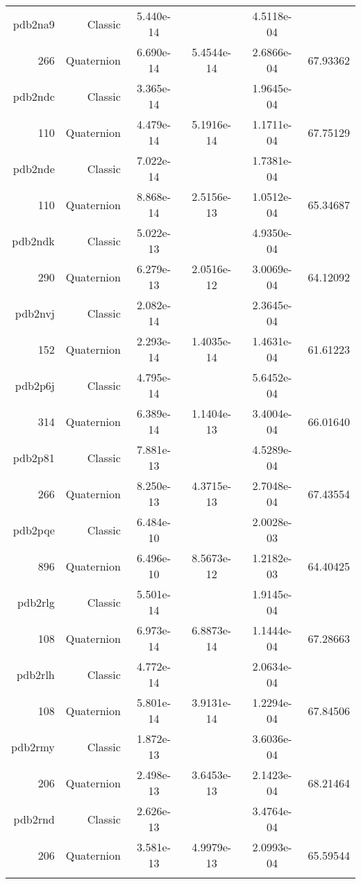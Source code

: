 \begin{xltabular}{\textwidth}{r|rS[table-format=1.3e+2]S[table-format=1.4e+2]S[table-format=1.4e+2]S[table-format=-1.5]}
pdb2na9 & Classic & 5.440e-14 &  & 4.5118e-04 & \\
266 & Quaternion & 6.690e-14 & 5.4544e-14 & 2.6866e-04 & 67.93362\\  \addlinespace
pdb2ndc & Classic & 3.365e-14 &  & 1.9645e-04 & \\
110 & Quaternion & 4.479e-14 & 5.1916e-14 & 1.1711e-04 & 67.75129\\  \addlinespace
pdb2nde & Classic & 7.022e-14 &  & 1.7381e-04 & \\
110 & Quaternion & 8.868e-14 & 2.5156e-13 & 1.0512e-04 & 65.34687\\  \addlinespace
pdb2ndk & Classic & 5.022e-13 &  & 4.9350e-04 & \\
290 & Quaternion & 6.279e-13 & 2.0516e-12 & 3.0069e-04 & 64.12092\\  \addlinespace
pdb2nvj & Classic & 2.082e-14 &  & 2.3645e-04 & \\
152 & Quaternion & 2.293e-14 & 1.4035e-14 & 1.4631e-04 & 61.61223\\  \addlinespace
pdb2p6j & Classic & 4.795e-14 &  & 5.6452e-04 & \\
314 & Quaternion & 6.389e-14 & 1.1404e-13 & 3.4004e-04 & 66.01640\\  \addlinespace
pdb2p81 & Classic & 7.881e-13 &  & 4.5289e-04 & \\
266 & Quaternion & 8.250e-13 & 4.3715e-13 & 2.7048e-04 & 67.43554\\  \addlinespace
pdb2pqe & Classic & 6.484e-10 &  & 2.0028e-03 & \\
896 & Quaternion & 6.496e-10 & 8.5673e-12 & 1.2182e-03 & 64.40425\\  \addlinespace
pdb2rlg & Classic & 5.501e-14 &  & 1.9145e-04 & \\
108 & Quaternion & 6.973e-14 & 6.8873e-14 & 1.1444e-04 & 67.28663\\  \addlinespace
pdb2rlh & Classic & 4.772e-14 &  & 2.0634e-04 & \\
108 & Quaternion & 5.801e-14 & 3.9131e-14 & 1.2294e-04 & 67.84506\\  \addlinespace
pdb2rmy & Classic & 1.872e-13 &  & 3.6036e-04 & \\
206 & Quaternion & 2.498e-13 & 3.6453e-13 & 2.1423e-04 & 68.21464\\  \addlinespace
pdb2rnd & Classic & 2.626e-13 &  & 3.4764e-04 & \\
206 & Quaternion & 3.581e-13 & 4.9979e-13 & 2.0993e-04 & 65.59544\\  \addlinespace

\end{xltabular}
